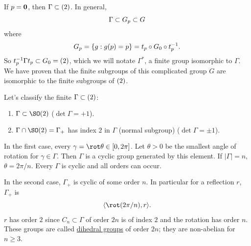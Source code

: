 \documentclass[11pt, oneside]{amsart}
\numberwithin{equation}{section}
\numberwithin{theorem}{section}
\theoremstyle{definition}
\let\O\relax
\let\bf\relax
\def\0{\mathbf{0}}
\begin{document}
If $\bf p = \0$, then $\Gamma \subset \O(2)$. In general,
$$
\Gamma \subset G_\bf p \subset G
$$
where
$$
G_\bf p = \{g : g(\bf p) = \bf p\} = t_\bf p\circ G_0 \circ t_\bf p^{-1}.
$$
So $t_\bf p^{-1} \Gamma t_\bf p\subset G_0 = \O(2)$, which we will notate $\Gamma^*$, a finite group isomorphic to $\Gamma$. We have proven that the finite subgroups of this complicated group $G$ are isomorphic to the finite subgroups of $\O(2)$.

Let's classify the finite $\Gamma \subset \O(2)$:
\begin{enumerate}[label=(\roman*)]
\item $\Gamma\subset \SO(2)$ ($\det \Gamma = +1$).
\item $\Gamma \cap \SO(2) = \Gamma_+ $ has index $2$ in $\Gamma$ (normal subgroup) ($\det \Gamma = \pm 1$).
\end{enumerate}
In the first case, every $\gamma = \rot \theta \in [0,2\pi]$. Let $\theta>0$ be the smallest angle of rotation for $\gamma\in \Gamma$. Then $\Gamma$ is a cyclic group generated by this element. If $|\Gamma| = n$,  $\theta = 2\pi/n$. Every $\Gamma$ is cyclic and all orders can occur. 

In the second case, $\Gamma_+$ is cyclic of some order $n$. In particular for a reflection $r$, $\Gamma_+$ is
$$
\langle \rot(2\pi/n), r \rangle.
$$
$r$ has order $2$ since $C_n \subset \Gamma$ of order $2n$ is of index $2$ and the rotation has order $n$. These groups are called \underline{dihedral groups} of order $2n$; they are non-abelian for $n\geqslant 3$.
\end{document}
